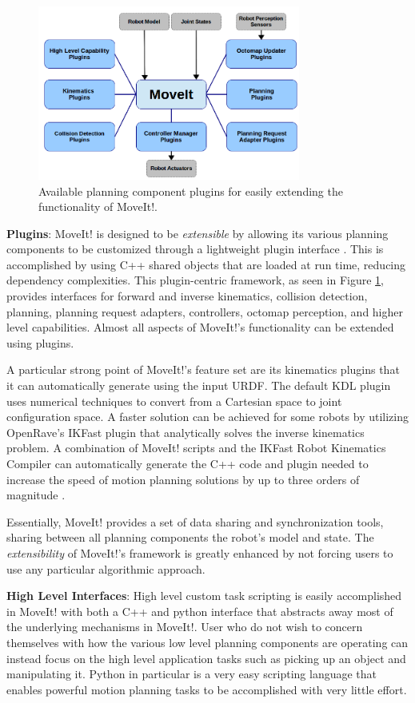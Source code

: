 \documentclass[10pt,journal,compsoc]{joser1}
\begin{document}
{\begin{figure}[!t]
\centering
\includegraphics[width=3.4in]{images/moveit_plugins}
\caption{Available planning component plugins for easily extending the functionality of MoveIt!.}
\label{fig:moveit_plugins}
\end{figure}

{\bf Plugins}: MoveIt! is designed to be \textit{extensible} by allowing its various planning components to be customized through a lightweight plugin interface \cite{moveit}. This is accomplished by using C++ shared objects that are loaded at run time, reducing dependency complexities. This plugin-centric framework, as seen in Figure \ref{fig:moveit_plugins}, provides interfaces for forward and inverse kinematics, collision detection, planning, planning request adapters, controllers, octomap perception, and higher level capabilities. Almost all aspects of MoveIt!'s functionality can be extended using plugins.

A particular strong point of MoveIt!'s feature set are its kinematics plugins that it can automatically generate using the input URDF. The default KDL plugin uses numerical techniques to convert from a Cartesian space to joint configuration space. A faster solution can be achieved for some robots by utilizing OpenRave's IKFast \cite{ikfast} plugin that analytically solves the inverse kinematics problem. A combination of MoveIt! scripts and the IKFast Robot Kinematics Compiler can automatically generate the C++ code and plugin needed to increase the speed of motion planning solutions by up to three orders of magnitude \cite{ikfast}.

Essentially, MoveIt! provides a set of data sharing and synchronization tools, sharing between all planning components the robot's model and state. The \textit{extensibility} of MoveIt!'s framework is greatly enhanced by not forcing users to use any particular algorithmic approach. 

{\bf High Level Interfaces}: High level custom task scripting is easily accomplished in MoveIt! with both a C++ and python interface that abstracts away most of the underlying mechanisms in MoveIt!. User who do not wish to concern themselves with how the various low level planning components are operating can instead focus on the high level application tasks such as picking up an object and manipulating it. Python in particular is a very easy scripting language that enables powerful motion planning tasks to be accomplished with very little effort.

}
\end{document}

